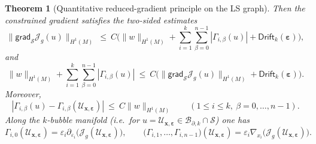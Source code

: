 \documentclass[11pt,reqno,a4paper]{amsart}
\numberwithin{equation}{section}
\theoremstyle{plain}
\newtheorem{theorem}{Theorem}[section]
\theoremstyle{remark}
\theoremstyle{plain}
\begin{document}
\begin{theorem}[Quantitative reduced-gradient principle on the LS graph]
Then the constrained gradient satisfies the two-sided estimates
\begin{equation}\label{eq:k-reduced-gradient-equivalence}
\|\mathsf{grad}_{\mathcal S}\mathcal J_g(u)\|_{H^1(M)}
\ \le\ C\Big(\|w\|_{H^1(M)}+\sum_{i=1}^k\sum_{\beta=0}^{n-1}|\Gamma_{i,\beta}(u)|+\mathsf{Drift}_k(\boldsymbol\varepsilon)\Big),
\end{equation}
and
\begin{equation}\label{eq:k-reduced-gradient-equivalence-2}
\|w\|_{H^1(M)}+\sum_{i=1}^k\sum_{\beta=0}^{n-1}|\Gamma_{i,\beta}(u)|
\ \le\ C\Big(\|\mathsf{grad}_{\mathcal S}\mathcal J_g(u)\|_{H^1(M)}+\mathsf{Drift}_k(\boldsymbol\varepsilon)\Big).
\end{equation}
Moreover,
\[
|\Gamma_{i,\beta}(u)-\Gamma_{i,\beta}(\mathcal U_{\mathbf x,\boldsymbol\varepsilon})|
\ \le\ C\|w\|_{H^1(M)}\qquad(1\le i\le k,\ \beta=0,\dots,n-1).
\]
Along the $k$-bubble manifold (i.e.\ for $u=\mathcal U_{\mathbf x,\boldsymbol\varepsilon}\in\mathcal B_{\partial,k}\cap\mathcal S$) one has
\[
\Gamma_{i,0}(\mathcal U_{\mathbf x,\boldsymbol\varepsilon})
=\varepsilon_i\partial_{\varepsilon_i}\big(\mathcal J_g(\mathcal U_{\mathbf x,\boldsymbol\varepsilon})\big),
\qquad
\big(\Gamma_{i,1},\dots,\Gamma_{i,n-1}\big)(\mathcal U_{\mathbf x,\boldsymbol\varepsilon})
=\varepsilon_i\nabla_{x_i}\big(\mathcal J_g(\mathcal U_{\mathbf x,\boldsymbol\varepsilon})\big).
\]
\end{theorem}
\end{document}
